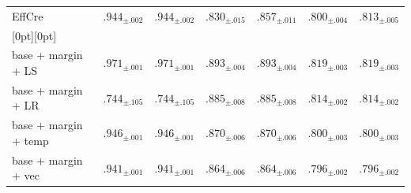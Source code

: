 \begin{table}[t]
\begin{tabular}{@{}l cc cc cc@{}}
EffCre & $.944_{\pm .002}$ & $.944_{\pm .002}$ & $.830_{\pm .015}$ & $.857_{\pm .011}$ & $.800_{\pm .004}$ & $.813_{\pm .005}$ \\
\addlinespace[0.4em]
\rowcolor[gray]{0.92}[0pt][0pt]
\multicolumn{7}{@{}l@{}}{\textbf{Calibration}} \\
\addlinespace[0.15em]
base + margin + LS & $\mathbf{.971_{\pm .001}}$ & $\mathbf{.971_{\pm .001}}$ & $\mathbf{.893_{\pm .004}}$ & $\mathbf{.893_{\pm .004}}$ & $.819_{\pm .003}$ & $.819_{\pm .003}$ \\
base + margin + LR & $.744_{\pm .105}$ & $.744_{\pm .105}$ & $.885_{\pm .008}$ & $.885_{\pm .008}$ & $.814_{\pm .002}$ & $.814_{\pm .002}$ \\
base + margin + temp & $.946_{\pm .001}$ & $.946_{\pm .001}$ & $.870_{\pm .006}$ & $.870_{\pm .006}$ & $.800_{\pm .003}$ & $.800_{\pm .003}$ \\
base + margin + vec & $.941_{\pm .001}$ & $.941_{\pm .001}$ & $.864_{\pm .006}$ & $.864_{\pm .006}$ & $.796_{\pm .002}$ & $.796_{\pm .002}$ \\
\bottomrule
\end{tabular}
\end{table}
